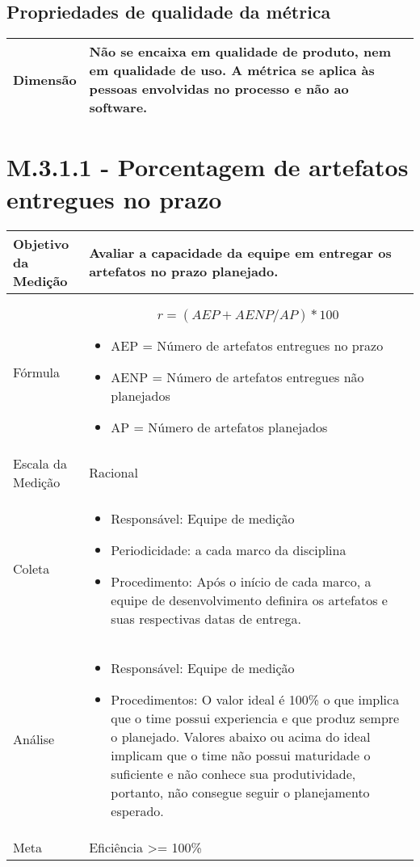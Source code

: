 	\subsection{Propriedades de qualidade da métrica}

	\begin{tabular}{ |p{4cm}|p{8cm}| }
	\hline
	   Dimensão 		& 	Não se encaixa em qualidade de produto, nem em qualidade de uso. A métrica se aplica às pessoas envolvidas no processo e não ao software.	 \\
	 \hline
	\end{tabular}

\section{M.3.1.1 - Porcentagem de artefatos entregues no prazo} %

	\begin{tabular}{ |p{4cm}|p{8cm}|  }
	 \hline
	 Objetivo da Medição 		&  	 Avaliar a capacidade da equipe em entregar os artefatos no prazo planejado.  \\ %
	 \hline
	 Fórmula		& 	 \[ r = (AEP + AENP / AP) * 100 \]	\begin{itemize} \item AEP = Número de artefatos entregues no prazo \item AENP = Número de artefatos entregues não planejados \item AP = Número de artefatos planejados\end{itemize}\\
	 \hline
	 Escala da Medição 		& 	Racional	 \\
	 \hline
	 Coleta		& 	\begin{itemize} \item Responsável: Equipe de medição \item Periodicidade: a cada marco da disciplina \item Procedimento: Após o início de cada marco, a equipe de desenvolvimento definira os artefatos e suas respectivas datas de entrega. \end{itemize}	\\
	 \hline
	 Análise		& 	\begin{itemize} \item Responsável: Equipe de medição \item Procedimentos: O valor ideal é 100\% o que implica que o time possui experiencia e que produz sempre o planejado. Valores abaixo ou acima do ideal implicam que o time não possui maturidade o suficiente e não conhece sua produtividade, portanto, não consegue seguir o planejamento esperado. \end{itemize} \\
	 \hline
	 Meta		& 	Eficiência >= 100\% 	 \\
	 \hline
	\end{tabular}

